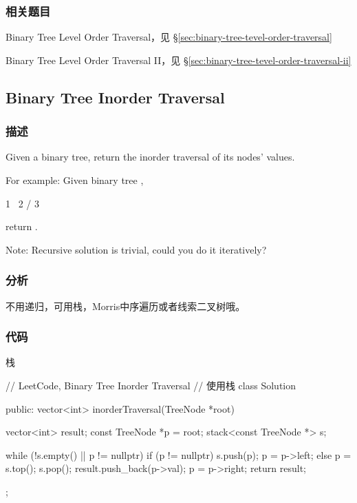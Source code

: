 \subsubsection{相关题目}
\begindot
\item Binary Tree Level Order Traversal，见 \S \ref{sec:binary-tree-tevel-order-traversal}
\item Binary Tree Level Order Traversal II，见 \S \ref{sec:binary-tree-tevel-order-traversal-ii}
\myenddot


\subsection{Binary Tree Inorder Traversal}
\label{sec:binary-tree-inorder-traversal}


\subsubsection{描述}
Given a binary tree, return the inorder traversal of its nodes' values.

For example:
Given binary tree ,
\begin{Code}
 1
  \
   2
  /
 3
\end{Code}
return \code{[1,3,2]}.

Note: Recursive solution is trivial, could you do it iteratively?


\subsubsection{分析}
不用递归，可用栈，Morris中序遍历或者线索二叉树哦。


\subsubsection{代码}

栈
\begin{Code}
// LeetCode, Binary Tree Inorder Traversal
// 使用栈
class Solution {
public:
    vector<int> inorderTraversal(TreeNode *root) {
        vector<int> result;
        const TreeNode *p = root;
        stack<const TreeNode *> s;

        while (!s.empty() || p != nullptr) {
            if (p != nullptr) {
                s.push(p);
                p = p->left;
            } else {
                p = s.top();
                s.pop();
                result.push_back(p->val);
                p = p->right;
            }
        }
        return result;
    }
};
\end{Code}

